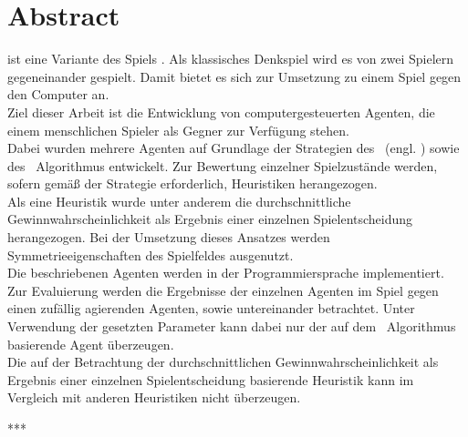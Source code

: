 \chapter*{Abstract}
\mxZitat{\ot} ist eine Variante des Spiels . Als klassisches Denkspiel wird es von zwei Spielern gegeneinander gespielt. Damit bietet es sich zur Umsetzung zu einem Spiel gegen den Computer an.
\\Ziel dieser Arbeit ist die Entwicklung von computergesteuerten Agenten, die einem menschlichen Spieler als Gegner zur Verfügung stehen.
\\Dabei wurden mehrere Agenten auf Grundlage der Strategien des \abab\ (engl. \mxZitat{\abp}) sowie des \mc\ Algorithmus entwickelt. Zur Bewertung einzelner Spielzustände werden, sofern gemäß der Strategie erforderlich, Heuristiken herangezogen.
\\Als eine Heuristik wurde unter anderem die durchschnittliche Gewinnwahrscheinlichkeit als Ergebnis einer einzelnen Spielentscheidung herangezogen. Bei der Umsetzung dieses Ansatzes werden Symmetrieeigenschaften des Spielfeldes ausgenutzt.
\\Die beschriebenen Agenten werden in der Programmiersprache  implementiert.
\\Zur Evaluierung werden die Ergebnisse der einzelnen Agenten im Spiel gegen einen zufällig agierenden Agenten, sowie untereinander betrachtet. Unter Verwendung der gesetzten Parameter kann dabei nur der auf dem \mc\ Algorithmus basierende Agent überzeugen.
\\Die auf der Betrachtung der durchschnittlichen Gewinnwahrscheinlichkeit als Ergebnis einer einzelnen Spielentscheidung basierende Heuristik kann im Vergleich mit anderen Heuristiken nicht überzeugen.

\begin{center}
***
\end{center}